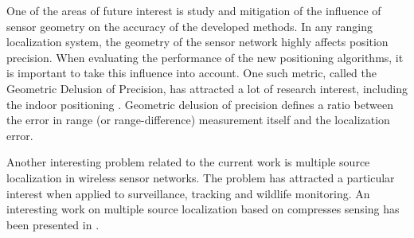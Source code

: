 One of the areas of future interest is study and mitigation of the influence of sensor geometry on the accuracy of the developed methods. In any ranging localization system, the geometry of the sensor network  highly affects position precision.   When evaluating the performance of the new positioning algorithms, it is important to  take this influence into account. One such metric, called the Geometric Delusion of Precision, has attracted a lot of research interest, including the indoor positioning \cite{Sharp, Sharp2}. Geometric delusion of precision defines a ratio between the error in range (or range-difference) measurement itself and the localization error.

Another interesting problem related to the current work is multiple source localization in wireless sensor networks. The problem has attracted a particular interest when applied to surveillance, tracking and wildlife monitoring. An interesting work on multiple source localization based on compresses sensing has been presented in \cite{LiuCS, LinCai}.



